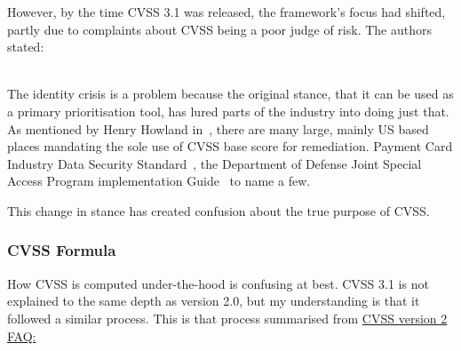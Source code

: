 \documentclass[12pt]{article}
\begin{document}
However, by the time CVSS 3.1 was released, the framework's focus had shifted, partly due to
complaints about CVSS being a poor judge of risk. The authors stated:

\textit{}~\cite{CVSS_31}
\\

The identity crisis is a problem because the original stance, that it can be used as a primary
prioritisation tool, has lured parts of the industry into doing just that. As mentioned by Henry
Howland in~\cite{ubiquitous}, there are many large, mainly US based places mandating the sole use of
CVSS base score for remediation. Payment Card Industry Data Security Standard~\cite{PCI}, the
Department of Defense Joint Special Access Program implementation Guide~\cite{DOD} to name a few.

This change in stance has created confusion about the true purpose of CVSS.

\subsubsection{CVSS Formula}


How CVSS is computed under-the-hood is confusing at best. CVSS 3.1 is not explained to the same
depth as version 2.0, but my understanding is that it followed a similar process. This is that
process summarised from
\href{https://www.first.org/cvss/v2/faq#Explanation-of-CVSS-v2-formula-and-metric-valued-development}{CVSS
	version 2 FAQ:}~\cite{CVSS_formula}
\end{document}
